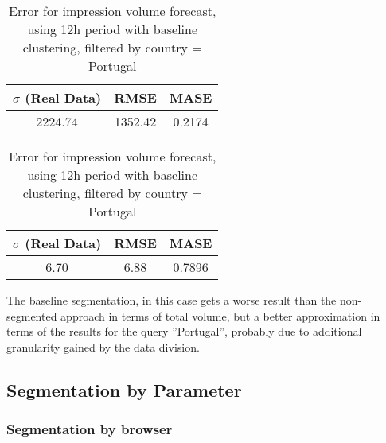 \begin{table}[!ht]
\centering
\footnotesize
\begin{minipage}[t]{0.45\linewidth}
\centering
\footnotesize
\begin{tabular}{ccc}
 $\sigma$ (Real Data) & RMSE & MASE   \\ \hline
2224.74 & 1352.42 & 0.2174 \\
\end{tabular}

\vspace{0.5cm}

\caption[Volume
impression forecast, baseline]{Error for volume impression forecast, using 12h
period with baseline clustering}
\label{tab:err_forecast_12_real_data_baseline}
\end{minipage}
\quad
\begin{minipage}[t]{0.45\linewidth}
\centering
\footnotesize
\begin{tabular}{ccc}
 $\sigma$ (Real Data) & RMSE & MASE   \\ \hline
6.70 & 6.88 & 0.7896 \\
\end{tabular}

\vspace{0.5cm}

\caption[Volume
impression forecast, safari]{Error for impression volume
forecast, using 12h period with baseline clustering, filtered by country =
Portugal}
\label{tab:err_forecast_12_real_data_baseline_filtered}
\end{minipage}

\end{table}

The baseline segmentation, in this case gets a worse result than the
non-segmented approach in terms of total volume, but a better approximation
in terms of the results for the query ''Portugal'', probably due to additional
granularity gained by the data division.


\subsection*{Segmentation by Parameter}

\subsubsection*{Segmentation by browser}

